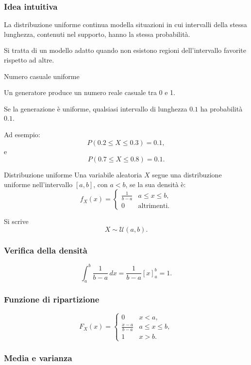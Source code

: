 \subsubsection{Idea intuitiva}

La distribuzione uniforme continua
modella situazioni in cui
intervalli della stessa lunghezza,
contenuti nel supporto,
hanno la stessa probabilità.

Si tratta di un modello adatto
quando non esistono regioni
dell'intervallo favorite rispetto ad altre.

\begin{example}{Numero casuale uniforme}

Un generatore produce un numero reale
casuale tra 0 e 1.

Se la generazione è uniforme,
qualsiasi intervallo di lunghezza $0.1$
ha probabilità $0.1$.

Ad esempio:
\[
P(0.2\leq X\leq0.3)=0.1,
\]
e
\[
P(0.7\leq X\leq0.8)=0.1.
\]
\end{example}

\begin{definition}{Distribuzione uniforme}
Una variabile aleatoria $X$ segue
una distribuzione uniforme
nell'intervallo $[a,b]$, con $a<b$,
se la sua densità è:
\[
\boxed{
f_X(x)=
\begin{cases}
\frac1{b-a} & a\leq x\leq b,\\
0 & \text{altrimenti}.
\end{cases}
}
\]

Si scrive
\[
X\sim\mathcal{U}(a,b).
\]
\end{definition}

\subsubsection{Verifica della densità}

\[
\int_a^b\frac1{b-a}\,dx
=
\frac1{b-a}[x]_a^b
=
1.
\]

\subsubsection{Funzione di ripartizione}

\[
\boxed{
F_X(x)=
\begin{cases}
0 & x<a,\\
\frac{x-a}{b-a} & a\leq x\leq b,\\
1 & x>b.
\end{cases}
}
\]

\subsubsection{Media e varianza}

